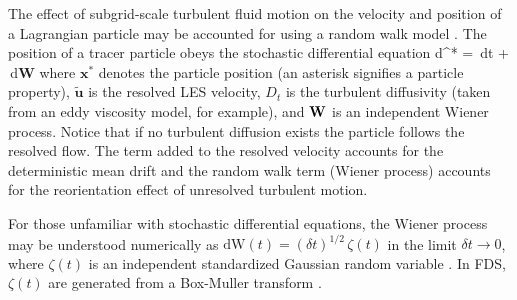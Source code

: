 The effect of subgrid-scale turbulent fluid motion on the velocity and position of a Lagrangian particle may be accounted for using a random walk model \cite{Raman:CF}.  The position of a tracer particle obeys the stochastic differential equation
\be
\mbox{d}^* =  \,\mbox{d}t +  \,\mbox{d}\mbox{\textbf{W}}
\ee
where $\mathbf{x}^*$ denotes the particle position (an asterisk signifies a particle property), $\tilde{\mathbf{u}}$ is the resolved LES velocity, $D_t$ is the turbulent diffusivity (taken from an eddy viscosity model, for example), and $\mbox{\textbf{W}}$ is an independent Wiener process.  Notice that if no turbulent diffusion exists the particle follows the resolved flow.  The term added to the resolved velocity accounts for the deterministic mean drift and the random walk term (Wiener process) accounts for the reorientation effect of unresolved turbulent motion.

For those unfamiliar with stochastic differential equations, the Wiener process may be understood numerically as $\mbox{dW}(t) = (\delta t)^{1/2} \, \zeta(t)$ in the limit $\delta t \rightarrow 0$, where $\zeta(t)$ is an independent standardized Gaussian random variable \cite{Pope:2000}.  In FDS, $\zeta(t)$ are generated from a Box-Muller transform \cite{Box-Muller:1958}.






















